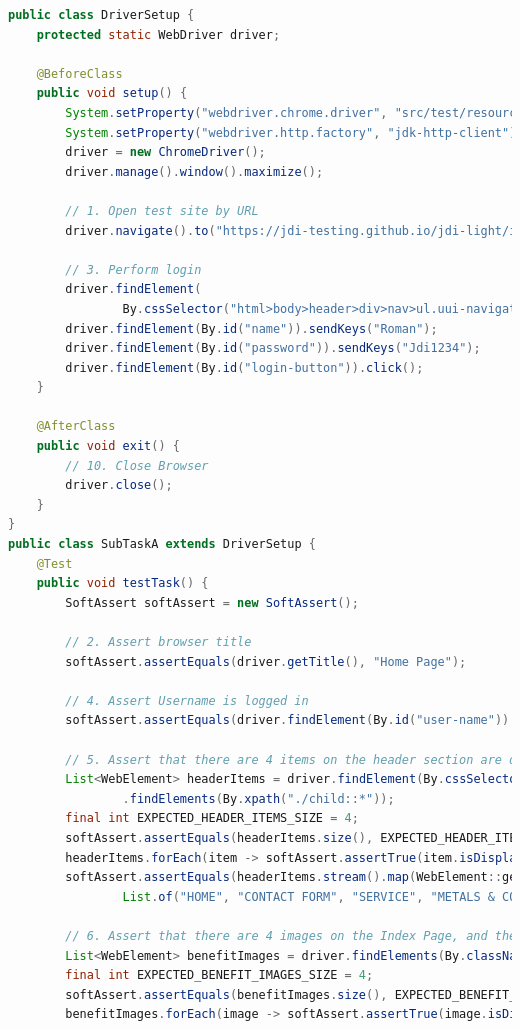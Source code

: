 \documentclass[a4paper]{article}
\begin{document}
    \begin{lstlisting}[language=Java]
public class DriverSetup {
    protected static WebDriver driver;

    @BeforeClass
    public void setup() {
        System.setProperty("webdriver.chrome.driver", "src/test/resources/chromedriver");
        System.setProperty("webdriver.http.factory", "jdk-http-client");
        driver = new ChromeDriver();
        driver.manage().window().maximize();

        // 1. Open test site by URL
        driver.navigate().to("https://jdi-testing.github.io/jdi-light/index.html");

        // 3. Perform login
        driver.findElement(
                By.cssSelector("html>body>header>div>nav>ul.uui-navigation.navbar-nav.navbar-right>li>a>span")).click();
        driver.findElement(By.id("name")).sendKeys("Roman");
        driver.findElement(By.id("password")).sendKeys("Jdi1234");
        driver.findElement(By.id("login-button")).click();
    }

    @AfterClass
    public void exit() {
        // 10. Close Browser
        driver.close();
    }
}
public class SubTaskA extends DriverSetup {
    @Test
    public void testTask() {
        SoftAssert softAssert = new SoftAssert();

        // 2. Assert browser title
        softAssert.assertEquals(driver.getTitle(), "Home Page");

        // 4. Assert Username is logged in
        softAssert.assertEquals(driver.findElement(By.id("user-name")).getText(), "ROMAN IOVLEV");

        // 5. Assert that there are 4 items on the header section are displayed, and they have proper texts
        List<WebElement> headerItems = driver.findElement(By.cssSelector("ul.uui-navigation.nav.navbar-nav.m-l8"))
                .findElements(By.xpath("./child::*"));
        final int EXPECTED_HEADER_ITEMS_SIZE = 4;
        softAssert.assertEquals(headerItems.size(), EXPECTED_HEADER_ITEMS_SIZE);
        headerItems.forEach(item -> softAssert.assertTrue(item.isDisplayed()));
        softAssert.assertEquals(headerItems.stream().map(WebElement::getText).toList(),
                List.of("HOME", "CONTACT FORM", "SERVICE", "METALS & COLORS"));

        // 6. Assert that there are 4 images on the Index Page, and they are displayed
        List<WebElement> benefitImages = driver.findElements(By.className("benefit-icon"));
        final int EXPECTED_BENEFIT_IMAGES_SIZE = 4;
        softAssert.assertEquals(benefitImages.size(), EXPECTED_BENEFIT_IMAGES_SIZE);
        benefitImages.forEach(image -> softAssert.assertTrue(image.isDisplayed()));


\end{lstlisting}
\end{document}
